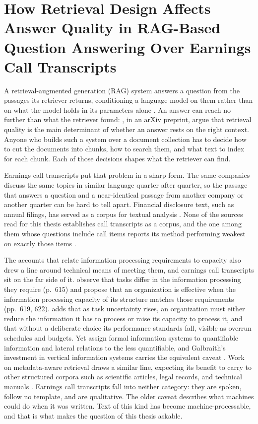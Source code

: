 \chapter[Introduction]{How Retrieval Design Affects Answer Quality in
RAG-Based Question Answering Over Earnings Call Transcripts}

A retrieval-augmented generation (RAG) system answers a question from the
passages its retriever
returns, conditioning a language model on them rather than on what the model
holds in its parameters alone \parencite{lewis2020}. An answer can reach no
further than what the retriever found: \textcite[1]{kobeissi2026}, in an arXiv
preprint, argue that
retrieval quality is the main determinant of whether an answer rests on the
right context. Anyone who builds such a system over a document collection has to
decide how to cut the documents into chunks, how to search them, and what text to
index for each chunk. Each of those decisions shapes what the retriever can
find.

Earnings call transcripts put that problem in a sharp form. The same companies
discuss the same topics in similar language quarter after quarter, so the
passage that answers a question and a near-identical passage from another
company or another quarter can be hard to tell apart. Financial disclosure text,
such as annual filings, has served as a corpus for textual analysis
\parencite{loughran2011}. None of the sources read for this thesis establishes
call transcripts as a corpus, and the one among them whose questions include
call items reports its method performing weakest on exactly those items
\parencite[8--9]{kobeissi2026}.

The accounts that relate information processing requirements to capacity also
drew a line around technical means of meeting them, and earnings call
transcripts sit on the far side of it. \textcite{tushman1978} observe that tasks
differ in the information processing they require (p.~615) and propose that an
organization is effective when the information processing capacity of its
structure matches those requirements (pp.~619, 622). \textcite[29, 36]{galbraith1974} adds that
as task uncertainty rises, an organization must either reduce the information it
has to process or raise its capacity to process it, and that without a
deliberate choice its performance standards fall, visible as overrun schedules
and budgets. Yet \textcite[618, 621]{tushman1978} assign formal information
systems to quantifiable information and lateral relations to the less
quantifiable, and Galbraith's investment in vertical information systems carries
the equivalent caveat \parencite[32]{galbraith1974}. Work on metadata-aware
retrieval draws a similar line, expecting its benefit to carry to other
structured corpora such as scientific articles, legal records, and technical
manuals \parencite[13]{yousuf2026}. Earnings call transcripts fall into neither
category: they are spoken, follow no template, and are qualitative. The older
caveat describes what machines could do when it was written. Text of this kind
has become machine-processable, and that is what makes the question of this
thesis askable.

